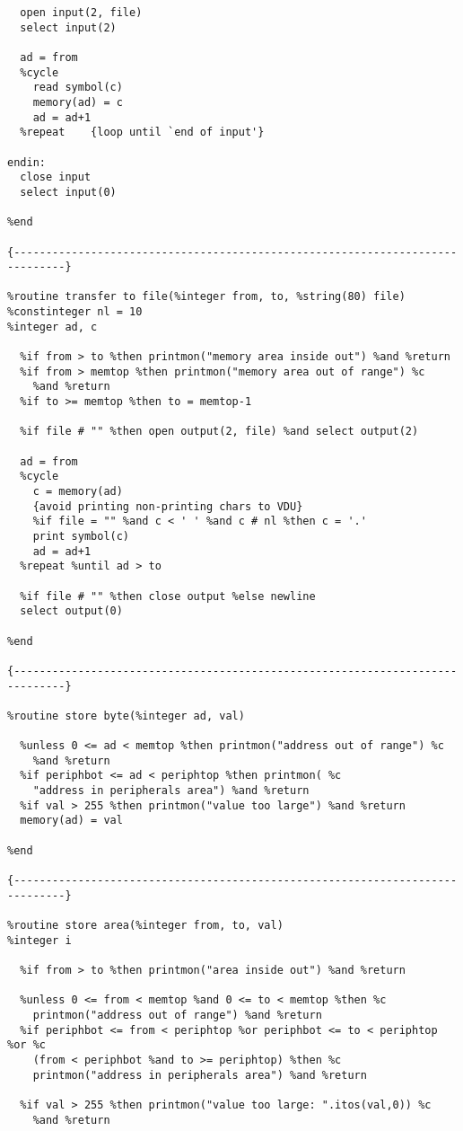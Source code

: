 \begin{verbatim}
  open input(2, file)
  select input(2)

  ad = from
  %cycle
    read symbol(c)
    memory(ad) = c
    ad = ad+1
  %repeat    {loop until `end of input'}
      
endin:
  close input
  select input(0)

%end

{------------------------------------------------------------------------------}

%routine transfer to file(%integer from, to, %string(80) file)
%constinteger nl = 10
%integer ad, c

  %if from > to %then printmon("memory area inside out") %and %return
  %if from > memtop %then printmon("memory area out of range") %c
    %and %return
  %if to >= memtop %then to = memtop-1
  
  %if file # "" %then open output(2, file) %and select output(2)
  
  ad = from
  %cycle
    c = memory(ad)
    {avoid printing non-printing chars to VDU}
    %if file = "" %and c < ' ' %and c # nl %then c = '.'
    print symbol(c)
    ad = ad+1
  %repeat %until ad > to

  %if file # "" %then close output %else newline
  select output(0)

%end

{------------------------------------------------------------------------------}

%routine store byte(%integer ad, val)

  %unless 0 <= ad < memtop %then printmon("address out of range") %c
    %and %return
  %if periphbot <= ad < periphtop %then printmon( %c
    "address in peripherals area") %and %return
  %if val > 255 %then printmon("value too large") %and %return
  memory(ad) = val

%end

{------------------------------------------------------------------------------}

%routine store area(%integer from, to, val)
%integer i

  %if from > to %then printmon("area inside out") %and %return

  %unless 0 <= from < memtop %and 0 <= to < memtop %then %c
    printmon("address out of range") %and %return
  %if periphbot <= from < periphtop %or periphbot <= to < periphtop %or %c
    (from < periphbot %and to >= periphtop) %then %c
    printmon("address in peripherals area") %and %return

  %if val > 255 %then printmon("value too large: ".itos(val,0)) %c
    %and %return


\end{verbatim}
